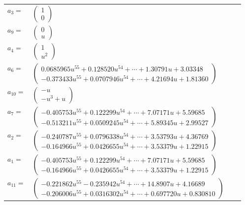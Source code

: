 \documentclass[1p]{elsarticle_modified}
\theoremstyle{definition}
\begin{document}
\begin{tabular}{m{7pt} m{180pt} m{7pt} m{180pt} }
\flushright $a_{3}=$&$\begin{pmatrix}1\\0\end{pmatrix}$ \\
\flushright $a_{9}=$&$\begin{pmatrix}0\\u\end{pmatrix}$ \\
\flushright $a_{4}=$&$\begin{pmatrix}1\\u^2\end{pmatrix}$ \\
\flushright $a_{6}=$&$\begin{pmatrix}0.0685965 u^{55}+0.128520 u^{54}+\cdots+1.30791 u+3.03348\\-0.373433 u^{55}+0.0707946 u^{54}+\cdots+4.21694 u+1.81360\end{pmatrix}$ \\
\flushright $a_{10}=$&$\begin{pmatrix}- u\\- u^3+u\end{pmatrix}$ \\
\flushright $a_{7}=$&$\begin{pmatrix}-0.405753 u^{55}+0.122299 u^{54}+\cdots+7.07171 u+5.59685\\-0.513211 u^{55}+0.0509245 u^{54}+\cdots+5.89345 u+2.99527\end{pmatrix}$ \\
\flushright $a_{2}=$&$\begin{pmatrix}-0.240787 u^{55}+0.0796338 u^{54}+\cdots+3.53793 u+4.36769\\-0.164966 u^{55}+0.0426655 u^{54}+\cdots+3.53379 u+1.22915\end{pmatrix}$ \\
\flushright $a_{1}=$&$\begin{pmatrix}-0.405753 u^{55}+0.122299 u^{54}+\cdots+7.07171 u+5.59685\\-0.164966 u^{55}+0.0426655 u^{54}+\cdots+3.53379 u+1.22915\end{pmatrix}$ \\
\flushright $a_{11}=$&$\begin{pmatrix}-0.221862 u^{55}-0.235942 u^{54}+\cdots+14.8907 u+4.16689\\-0.206006 u^{55}+0.0316302 u^{54}+\cdots+0.697720 u+0.830810\end{pmatrix}$ \\

\end{tabular}
\end{document}
